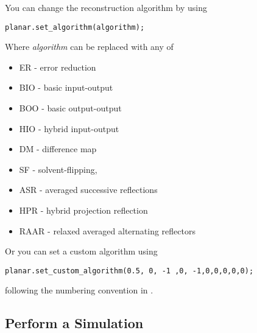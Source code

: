\documentclass[]{nadia}
\begin{document}
You can change the reconstruction algorithm by using
\begin{verbatim}
planar.set_algorithm(algorithm);
\end{verbatim}

Where \emph{algorithm} can be replaced with any of 
\begin{itemize}
\item ER - error reduction
\item BIO - basic input-output
\item BOO - basic output-output
\item HIO - hybrid input-output
\item DM - difference map
\item SF - solvent-flipping,
\item ASR - averaged successive reflections
\item HPR - hybrid projection reflection
\item RAAR - relaxed averaged alternating reflectors
\end{itemize}
Or you can set a custom algorithm using 

\begin{verbatim}
planar.set_custom_algorithm(0.5, 0, -1 ,0, -1,0,0,0,0,0);
\end{verbatim}

following the numbering convention in \cite{quiney2010coherent}.\\




\subsection{Perform a Simulation}
\end{document}
